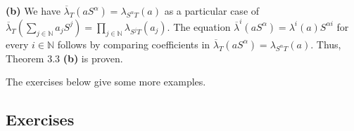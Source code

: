 \documentclass[numbers=enddot,12pt,final,onecolumn,notitlepage]{scrartcl}%
\begin{document}
\textbf{(b)} We have $\overline{\lambda}_{T}\left(  aS^{\alpha}\right)
=\lambda_{S^{\alpha}T}\left(  a\right)  $ as a particular case of
$\overline{\lambda}_{T}\left(  \sum\limits_{j\in\mathbb{N}}a_{j}S^{j}\right)
=\prod\limits_{j\in\mathbb{N}}\lambda_{S^{j}T}\left(  a_{j}\right)  $. The
equation $\overline{\lambda}^{i}\left(  aS^{\alpha}\right)  =\lambda
^{i}\left(  a\right)  S^{\alpha i}$ for every $i\in\mathbb{N}$ follows by
comparing coefficients in $\overline{\lambda}_{T}\left(  aS^{\alpha}\right)
=\lambda_{S^{\alpha}T}\left(  a\right)  $. Thus, Theorem 3.3 \textbf{(b)} is proven.

The exercises below give some more examples.

\subsection{Exercises}
\end{document}
